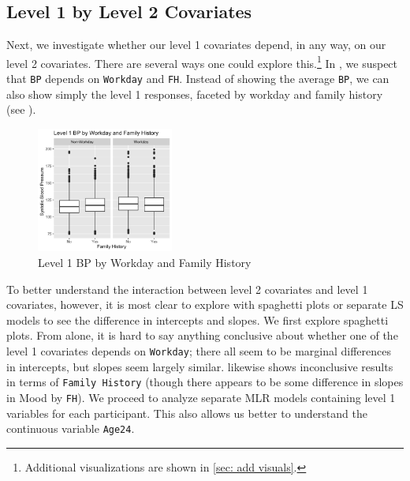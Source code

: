 \documentclass[12pt,twoside,letterpaper]{article}
\theoremstyle{definition}
\theoremstyle{definition}
\begin{document}
\subsection{Level 1 by Level 2 Covariates}\label{sec: lv1 x lv2}

Next, we investigate whether our level 1 covariates depend, in any way, on our level 2 covariates. There are several ways one could explore this.\footnote{Additional visualizations are shown in \autoref{sec: add visuals}.} In , we suspect that \texttt{BP} depends on \texttt{Workday} and \texttt{FH}. Instead of showing the average \texttt{BP}, we can also show simply the level 1 responses, faceted by workday and family history (see ).

\begin{figure} 
\centering
\includegraphics[width=0.4\textwidth]{pics/bp by day and fh.png}
\caption{Level 1 BP by Workday and Family History}
\label{fig: bp by day and fh}
\end{figure}

To better understand the interaction between level 2 covariates and level 1 covariates, however, it is most clear to explore with spaghetti plots or separate LS models to see the difference in intercepts and slopes. We first explore spaghetti plots. From  alone, it is hard to say anything conclusive about whether one of the level 1 covariates depends on \texttt{Workday}; there all seem to be marginal differences in intercepts, but slopes seem largely similar.  likewise shows inconclusive results in terms of \texttt{Family History} (though there appears to be some difference in slopes in Mood by \texttt{FH}). We proceed to analyze separate MLR models containing level 1 variables for each participant. This also allows us better to understand the continuous variable \texttt{Age24}. 
\end{document}
